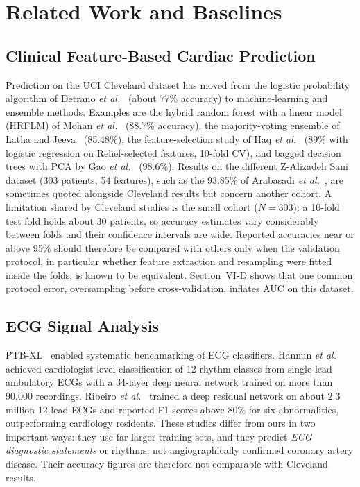 \section{Related Work and Baselines}
\subsection{Clinical Feature-Based Cardiac Prediction}
Prediction on the UCI Cleveland dataset has moved from the logistic probability algorithm of Detrano \emph{et al.}~\cite{detrano1989} (about 77\% accuracy) to machine-learning and ensemble methods. Examples are the hybrid random forest with a linear model (HRFLM) of Mohan \emph{et al.}~\cite{mohan2019} (88.7\% accuracy), the majority-voting ensemble of Latha and Jeeva~\cite{latha2019} (85.48\%), the feature-selection study of Haq \emph{et al.}~\cite{haq2018} (89\% with logistic regression on Relief-selected features, 10-fold CV), and bagged decision trees with PCA by Gao \emph{et al.}~\cite{gao2021} (98.6\%). Results on the different Z-Alizadeh Sani dataset (303 patients, 54 features), such as the 93.85\% of Arabasadi \emph{et al.}~\cite{arabasadi2017}, are sometimes quoted alongside Cleveland results but concern another cohort. A limitation shared by Cleveland studies is the small cohort ($N=303$): a 10-fold test fold holds about 30 patients, so accuracy estimates vary considerably between folds and their confidence intervals are wide. Reported accuracies near or above 95\% should therefore be compared with others only when the validation protocol, in particular whether feature extraction and resampling were fitted inside the folds, is known to be equivalent. Section~VI-D shows that one common protocol error, oversampling before cross-validation, inflates AUC on this dataset.

\subsection{ECG Signal Analysis}
PTB-XL~\cite{wagner2020} enabled systematic benchmarking of ECG classifiers. Hannun \emph{et al.}~\cite{hannun2019} achieved cardiologist-level classification of 12 rhythm classes from single-lead ambulatory ECGs with a 34-layer deep neural network trained on more than 90{,}000 recordings. Ribeiro \emph{et al.}~\cite{ribeiro2020} trained a deep residual network on about 2.3 million 12-lead ECGs and reported F1 scores above 80\% for six abnormalities, outperforming cardiology residents. These studies differ from ours in two important ways: they use far larger training sets, and they predict \emph{ECG diagnostic statements} or rhythms, not angiographically confirmed coronary artery disease. Their accuracy figures are therefore not comparable with Cleveland results.

